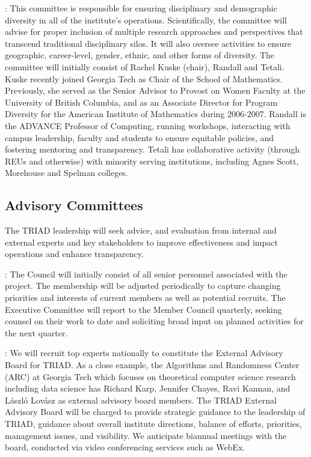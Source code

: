 \documentclass[12pt]{article}
\begin{document}
: This committee is responsible for ensuring disciplinary and demographic diversity in all of the institute's operations. Scientifically, the committee will advise for proper inclusion of multiple research approaches and perspectives that transcend traditional disciplinary silos. It  will also oversee activities to ensure geographic, career-level, gender, ethnic, and other forms of diversity. The committee will initially consist of Rachel Kuske (chair), Randall and Tetali. Kuske recently joined Georgia Tech as Chair of the School of Mathematics. Previously, she served as the Senior Advisor to Provost on Women Faculty at the University of British Columbia, and as an Associate Director for Program Diversity for the American Institute of Mathematics during 2006-2007. Randall is the ADVANCE Professor of Computing, running workshops, interacting with campus leadership, faculty and students to ensure equitable policies, and fostering mentoring and transparency. Tetali has collaborative activity (through REUs and otherwise) with minority serving institutions, including Agnes Scott, Morehouse and Spelman colleges.

\vspace{-.1in}
\subsection{Advisory Committees}
\label{sec:committees}
\vspace{-.1in}
The TRIAD  leadership will seek advice, and evaluation from  internal and external experts and key stakeholders to improve effectiveness and impact operations and enhance transparency.

:
The Council will initially consist of all senior personnel associated with the project. The membership will be adjusted periodically to capture changing priorities and interests of current members as well as potential recruits. The Executive Committee will report to the Member Council quarterly, seeking counsel on their work to date and soliciting broad input on planned activities for the next quarter.

:
We will recruit top experts nationally to constitute the External Advisory Board for TRIAD. As a close example, the Algorithms and Randomness Center (ARC) at Georgia Tech which focuses on theoretical computer science research including data science has Richard Karp, Jennifer Chayes, Ravi Kannan, and L\'aszl\'o Lov\'asz as external advisory board members. The TRIAD External Advisory Board will be charged to provide strategic guidance to the leadership of TRIAD, guidance about overall institute directions, balance of efforts, priorities, management issues, and visibility. We anticipate biannual meetings with the board, conducted via video conferencing services such as WebEx.
\end{document}
